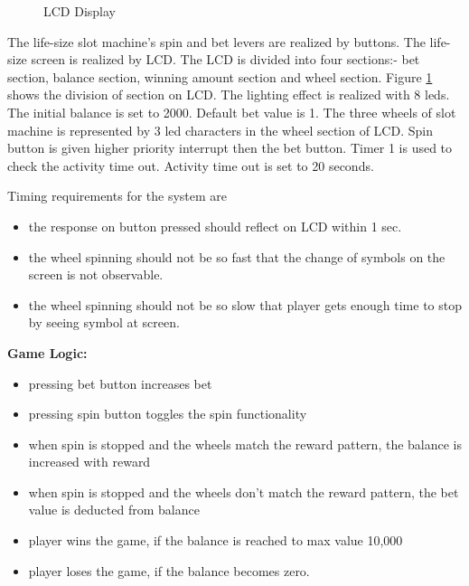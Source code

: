 \documentclass[a4paper,13pt,openany,sffamily]{memoir}
\begin{document}
\begin{figure}[h]
\caption{LCD Display }
\label{Fig_LCD_Split}
\end{figure}
The life-size slot machine's spin and bet levers are realized by buttons. The life-size screen is realized by LCD. The LCD is divided into four sections:- bet section, balance section, winning amount section and wheel section. Figure \ref{Fig_LCD_Split} shows the division of section on LCD. The lighting effect is realized with 8 leds. The initial balance is set to 2000. Default bet value is 1. The three wheels of slot machine is represented by 3 led characters in the wheel section of LCD. Spin button is given higher priority interrupt then the bet button. Timer 1 is used to check the activity time out. Activity time out is set to 20 seconds.  


\break
Timing requirements for the system are
\begin{itemize}
\item the response on button pressed should reflect on LCD within 1 sec.
\item the wheel spinning should not be so fast that the change of symbols on the screen is not observable.
\item the wheel spinning should not be so slow that player gets enough time to stop by seeing symbol at screen.
\end{itemize}


\large \textbf{ Game Logic:}

\begin{itemize}
\item pressing bet button increases bet
\item pressing spin button toggles the spin functionality 
\item when spin is stopped and the wheels match the reward pattern, the balance is increased with reward
\item when spin is stopped and the wheels don't match the reward pattern, the bet value is deducted from balance
\item player wins the game, if the balance is reached to max value 10,000
\item player loses the game, if the balance becomes zero.
\end{itemize}
\end{document}
